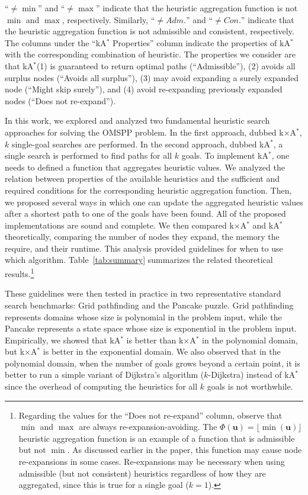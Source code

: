 \documentclass[smallextended]{svjour3}       %
\newcommand{\kD}{$k$-Dijkstra\xspace}
\newcommand{\omspp}{\ac{OMSPP}\xspace}
\newcommand{\kastar}{kA$^*$\xspace}
\newcommand{\kxastar}{k$\times$A$^*$\xspace}
\newcommand{\axiomadm}{admissible\xspace}
\newcommand{\axiomcons}{consistent\xspace}
\newcommand{\axiomreexpnoun}{re-expansion-avoiding\xspace}
\newcommand{\shortadm}{\mathit{Adm.}}
\newcommand{\shortcon}{\mathit{Con.}}
\newcommand{\vect}[1]{\mathbf{#1}}
\begin{document}
\begin{table}
{``$\neq \min$'' and ``$\neq \max$'' indicate that the heuristic aggregation function is not $\min$ and $\max$, respectively. Similarly, ``$\neq \shortadm$'' and ``$\neq \shortcon$'' indicate that the heuristic aggregation function is not \axiomadm and \axiomcons, respectively. 
The columns under the ``\kastar Properties'' column indicate the properties of \kastar with the corresponding combination of heuristic. The properties we consider are that \kastar (1) is guaranteed to return optimal paths (``Admissible''), (2) avoids all surplus nodes (``Avoids all surplus''), (3) may avoid expanding a surely expanded node (``Might skip surely''), and (4) avoid re-expanding previously expanded nodes (``Does not re-expand'').}
\label{tab:summary}
\end{table}


In this work, we explored and analyzed two fundamental heuristic search approaches for solving the \omspp problem. 
In the first approach, dubbed \kxastar, $k$ single-goal searches are performed. In the second approach, dubbed \kastar, a single search is performed to find paths for all $k$ goals. 
To implement \kastar, one needs to defined a function that aggregates heuristic values. We analyzed the relation between properties of the available heuristics and the sufficient and required conditions for the corresponding heuristic aggregation function. Then, we proposed several ways in which one can update the aggregated heuristic values after a shortest path to one of the goals have been found. All of the proposed implementations are sound and complete. 
We then compared \kxastar and \kastar theoretically, comparing the number of nodes they expand, the memory the require, and their runtime.
This analysis provided guidelines for when to use which algorithm. 
Table~\ref{tab:summary} summarizes the related theoretical results.\footnote{Regarding the values for the ``Does not re-expand'' column, observe that $\min$ and $\max$ are always \axiomreexpnoun. The $\Phi(\vect{u})=\lfloor \min(\vect{u}) \rfloor$ heuristic aggregation function is an example of a function that is admissible but not $\min$. As discussed earlier in the paper, this function may cause node re-expansions in some cases. Re-expansions may be necessary when using admissible (but not consistent) heuristics regardless of how they are aggregated, since this is true for a single goal ($k=1$).}

These guidelines were then tested in practice in two representative standard search benchmarks: Grid pathfinding and the Pancake puzzle. Grid pathfinding represents domains whose size is polynomial in the problem input, while the Pancake represents a state space whose size is exponential in the problem input. Empirically, we showed that \kastar is better than \kxastar in the polynomial domain, but \kxastar is better in the exponential domain. 
We also observed that in the polynomial domain, when the number of goals grows beyond a certain point, it is better to run a simple variant of Dijkstra's algorithm (\kD) instead of \kastar since the overhead of computing the heuristics for all $k$ goals is not worthwhile. 
\end{document}
